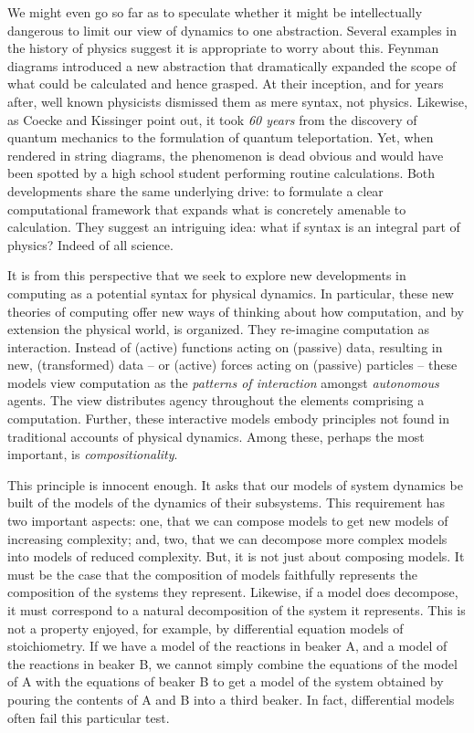 We might even go so far as to speculate whether it might be
intellectually dangerous to limit our view of dynamics to one
abstraction. Several examples in the history of physics suggest it is
appropriate to worry about this. Feynman diagrams introduced a new
abstraction that dramatically expanded the scope of what could be
calculated and hence grasped. At their inception, and for years after,
well known physicists dismissed them as mere syntax, not
physics. Likewise, as Coecke and Kissinger point out, it took \emph{60
  years} from the discovery of quantum mechanics to the formulation of
quantum teleportation. Yet, when rendered in string diagrams, the
phenomenon is dead obvious and would have been spotted by a high
school student performing routine calculations. Both developments
share the same underlying drive: to formulate a clear computational
framework that expands what is concretely amenable to
calculation. They suggest an intriguing idea: what if syntax is an
integral part of physics? Indeed of all science.

It is from this perspective that we seek to explore new developments
in computing as a potential syntax for physical dynamics. In
particular, these new theories of computing offer new ways of thinking
about how computation, and by extension the physical world, is
organized. They re-imagine computation as interaction. Instead of
(active) functions acting on (passive) data, resulting in new,
(transformed) data -- or (active) forces acting on (passive) particles
-- these models view computation as the \emph{patterns of interaction}
amongst \emph{autonomous} agents. The view distributes agency
throughout the elements comprising a computation. Further, these
interactive models embody principles not found in traditional accounts
of physical dynamics. Among these, perhaps the most important, is
\emph{compositionality}.

This principle is innocent enough. It asks that our models of system
dynamics be built of the models of the dynamics of their
subsystems. This requirement has two important aspects: one, that we
can compose models to get new models of increasing complexity; and,
two, that we can decompose more complex models into models of reduced
complexity. But, it is not just about composing models. It must be the
case that the composition of models faithfully represents the
composition of the systems they represent. Likewise, if a model does
decompose, it must correspond to a natural decomposition of the system
it represents. This is not a property enjoyed, for example, by
differential equation models of stoichiometry. If we have a model of
the reactions in beaker A, and a model of the reactions in beaker B,
we cannot simply combine the equations of the model of A with the
equations of beaker B to get a model of the system obtained by pouring
the contents of A and B into a third beaker. In fact, differential
models often fail this particular test.

